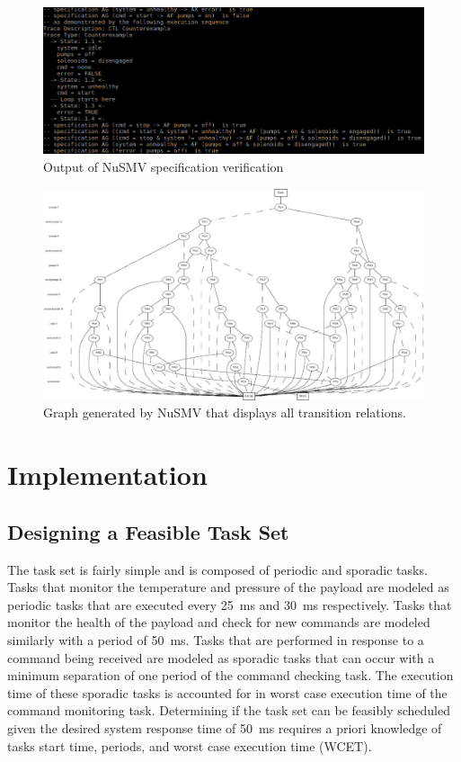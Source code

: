 \documentclass{article}
\begin{document}
\begin{figure}[H]
\centering
        \includegraphics[scale=.5]{output.png}
\caption{Output of NuSMV specification verification}
    \label{fig:output}
\end{figure}

\begin{figure}[H]
\centering
        \includegraphics[scale=.9]{transitions-cropped.pdf}
    \caption{Graph generated by NuSMV that displays all transition relations.}
    \label{fig:transitions}
\end{figure}
\pagebreak
\section{Implementation}
\subsection{Designing a Feasible Task Set}
The task set is fairly simple and is composed of periodic and sporadic tasks. Tasks that monitor the temperature and pressure of the payload are modeled as periodic tasks that are executed every  \SI{25}{\milli\second} and \SI{30}{\milli\second} respectively. Tasks that monitor the health of the payload and check for new commands are modeled similarly with a period of \SI{50}{\milli\second}. Tasks that are performed in response to a command being received are modeled as sporadic tasks that can occur with a minimum separation of one period of the command checking task. The execution time of these sporadic tasks is accounted for in worst case execution time of the command monitoring task. Determining if the task set can be feasibly scheduled given the desired system response time of  \SI{50}{\milli\second} requires a priori knowledge of tasks start time, periods, and worst case execution time (WCET). 
\end{document}

